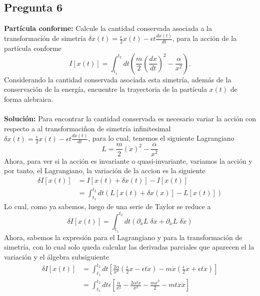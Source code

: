 \documentclass[../main.tex]{subfiles}
\begin{document}
\subsection{Pregunta 6}
\textbf{Partícula conforme:}
Calcule la cantidad conservada asociada a la transformación de simetría $\delta x(t)=\frac{\epsilon}{2}x(t)-\epsilon t\frac{dx(t)}{dt}$, para la acción de la partícula conforme
\begin{equation}
  I[x(t)] = \int_{t_1}^{t_2} dt \left( \frac{m}{2}\left( \frac{dx}{dt} \right)^2 - \frac{\alpha}{x^2} \right).
\end{equation}
Considerando la cantidad conservada asociada esta simetría, además de la conservación de la energía, encuentre la trayectoria de la partícula $x(t)$ de forma alebraica. \\
\\
\textbf{Solución:}
Para encontrar la cantidad conservada es necesario variar la acción con respecto a al transformaciñon de simetría infinitesimal $\delta x(t) = \frac{\epsilon}{2}x(t) - \epsilon t \frac{dx(t)}{dt}$, para lo cual, tenemos el siguiente Lagrangiano 
\begin{equation}
  L = \frac{m}{2}\left( \dot{x} \right)^2 - \frac{\alpha}{x^2}
\end{equation}
Ahora, para ver si la acción es invariante o quasi-invariante, variamos la acción y por tanto, el Lagrangiano, la variación de la accion es la siguiente
\begin{align*}
  \delta I[x(t)] & = I[x(t)+\delta x(t)]-I[x(t)] \\
  & = \int_{t_1}^{t_2} dt \left(L[x(t) + \delta x(x)] - L[x(t)]\right)
\end{align*}
Lo cual, como ya sabemos, luego de una serie de Taylor se reduce a
\begin{equation*}
  \delta I[x(t)] = \int_{t_1}^{t_2} dt \left( \partial_{x}L \; \delta x + \partial_{\dot{x}}L\; \delta \dot{x} \right)
\end{equation*}
Ahora, sabemos la expresión para el Lagrangiano y para la transformación de simetría, con lo cual solo queda calcular las derivadas parciales que aparecen el la variación y el álgebra subsiguiente
\begin{align*}
  \delta I [x(t)] & = \int_{t_1}^{t_2} dt \left[ \frac{2\alpha}{x^3} \left( \frac{\epsilon}{2}x -\epsilon t \dot{x}  \right) -  m\dot{x}\left( \frac{\epsilon}{2}\dot{x} + \epsilon t\ddot{x} \right) \right] \\
  & = \int_{t_1}^{t_2}  dt \epsilon\left[ \frac{\alpha}{x^2} - \frac{2\alpha t \dot{x}}{x^3} - \frac{m\dot{x}^2}{2} - m t \dot{x}\ddot{x}  \right]
\end{align*}
\end{document}
